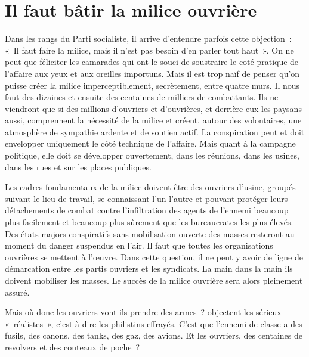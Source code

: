 \documentclass[french,twoside]{book} %
\begin{document}
 \section[{Il faut bâtir la milice ouvrière}]{Il faut bâtir la milice ouvrière}
\noindent Dans les rangs du Parti socialiste, il arrive d’entendre parfois cette objection : « Il faut faire la milice, mais il n’est pas besoin d’en parler tout haut ». On ne peut que féliciter les camarades qui ont le souci de soustraire le coté pratique de l’affaire aux yeux et aux oreilles importuns. Mais il est trop naïf de penser qu’on puisse créer la milice imperceptiblement, secrètement, entre quatre murs. Il nous faut des dizaines et ensuite des centaines de milliers de combattants. Ils ne viendront que si des millions d’ouvriers et d’ouvrières, et derrière eux les paysans aussi, comprennent la nécessité de la milice et créent, autour des volontaires, une atmosphère de sympathie ardente et de soutien actif. La conspiration peut et doit envelopper uniquement le côté technique de l’affaire. Mais quant à la campagne politique, elle doit se développer ouvertement, dans les réunions, dans les usines, dans les rues et sur les places publiques.\par
Les cadres fondamentaux de la milice doivent être des ouvriers d’usine, groupés suivant le lieu de travail, se connaissant l’un l’autre et pouvant protéger leurs détachements de combat contre l’infiltration des agents de l’ennemi beaucoup plus facilement et beaucoup plus sûrement que les bureaucrates les plus élevés. Des états-majors conspiratifs sans mobilisation ouverte des masses resteront au moment du danger suspendus en l’air. Il faut que toutes les organisations ouvrières se mettent à l’œuvre. Dans cette question, il ne peut y avoir de ligne de démarcation entre les partis ouvriers et les syndicats. La main dans la main ils doivent mobiliser les masses. Le succès de la milice ouvrière sera alors pleinement assuré.\par
Mais où donc les ouvriers vont-ils prendre des armes ? objectent les sérieux « réalistes », c’est-à-dire les philistins effrayés. C’est que l’ennemi de classe a des fusils,  des canons, des tanks, des gaz, des avions. Et les ouvriers, des centaines de revolvers et des couteaux de poche ?\par
\end{document}
